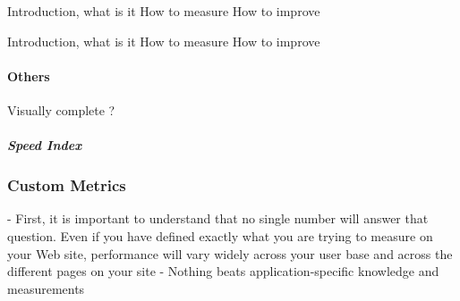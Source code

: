 
 Introduction, what is it
 How to measure
 How to improve



 Introduction, what is it
 How to measure
 How to improve








\paragraph{Others}




 Visually complete ?



\subparagraph{Speed Index}
















\subsubsection{Custom Metrics}


- First, it is important to understand that no single number will answer that question. Even if you have defined exactly what you are trying to measure on your Web site, performance will vary widely across your user base and across the different pages on your site
- Nothing beats application-specific knowledge and measurements

